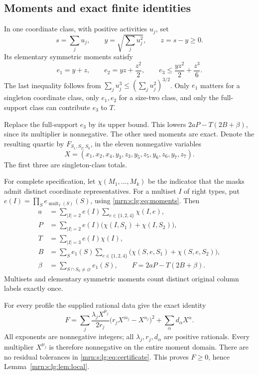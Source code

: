 \documentclass[11pt,a4paper]{article}
\theoremstyle{remark}\newtheorem{remark}[theorem]{Remark}
\begin{document}
\subsection{Moments and exact finite identities}\label{mrn:s:lg:sec:certificate}
In one coordinate class, with positive activities $u_j$, set
\[
 s=\sum_j u_j,\qquad y=\sqrt{\sum_j u_j^2},\qquad z=s-y\ge0.
\]
Its elementary symmetric moments satisfy
\begin{equation}\label{mrn:s:lg:eq:moments}
 e_1=y+z,\qquad e_2=yz+\frac{z^2}{2},\qquad
 e_3\le\frac{yz^2}{2}+\frac{z^3}{6}.
\end{equation}
The last inequality follows from $\sum_j u_j^3\le(\sum_j u_j^2)^{3/2}$.
Only $e_1$ matters for a singleton coordinate class, only $e_1,e_2$ for a size-two class, and only the full-support class can contribute $e_3$ to $T$.

Replace the full-support $e_3$ by its upper bound. This lowers
$2aP-T(2B+\beta)$, since its multiplier is nonnegative. The other used moments are exact. Denote the resulting quartic by $F_{S_1,S_2,S_0}$, in the eleven nonnegative variables
\[
 X=(x_1,x_2,x_4,y_3,z_3,y_5,z_5,y_6,z_6,y_7,z_7).
\]
The first three are singleton-class totals.

For complete specification, let $\chi(M_1,\ldots,M_k)$ be the indicator that the masks admit distinct coordinate representatives. For a multiset $I$ of right types, put
$e(I)=\prod_S e_{\operatorname{mult}_I(S)}(S)$, using \eqref{mrn:s:lg:eq:moments}. Then
\begin{align*}
 a&=\sum_{|I|=2}e(I)\sum_{e\in\{1,2,4\}}\chi(I,e),\\
 P&=\sum_{|I|=2}e(I)\bigl(\chi(I,S_1)+\chi(I,S_2)\bigr),\\
 T&=\sum_{|I|=3}e(I)\chi(I),\\
 B&=\sum_S e_1(S)\sum_{e\in\{1,2,4\}}
          \bigl(\chi(S,e,S_1)+\chi(S,e,S_2)\bigr),\\
 \beta&=\sum_{S\cap S_0\ne\varnothing}e_1(S),
 \qquad F=2aP-T(2B+\beta).
\end{align*}
Multisets and elementary symmetric moments count distinct original column labels exactly once.

For every profile the supplied rational data give the exact identity
\begin{equation}\label{mrn:s:lg:eq:certificate}
 F=\sum_j\frac{\lambda_jX^{\mu_j}}{2r_j}
                 \bigl(r_jX^{m_j}-X^{n_j}\bigr)^2
       +\sum_\alpha d_\alpha X^\alpha.
\end{equation}
All exponents are nonnegative integers; all $\lambda_j,r_j,d_\alpha$ are positive rationals. Every multiplier $X^{\mu_j}$ is therefore nonnegative on the entire moment domain. There are no residual tolerances in \eqref{mrn:s:lg:eq:certificate}. This proves $F\ge0$, hence Lemma~\ref{mrn:s:lg:lem:local}.
\end{document}
